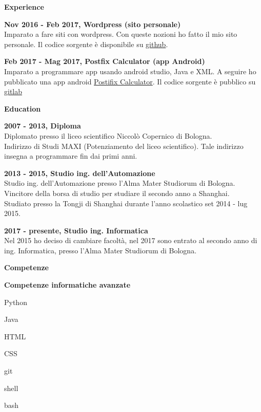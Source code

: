 \documentclass[a4paper,12pt,final]{memoir}
\newcommand{\Sep}{\vspace{1.5em}}
\newcommand{\SmallSep}{\vspace{0.5em}}
\newcommand{\CVSection}[1]
	{\Large\textbf{#1}\par
	\SmallSep\normalsize\normalfont}
\newcommand{\CVItem}[1]
	{\textbf{\color{RoyalBlue} #1}}
\begin{document}
\CVSection{Experience}
\CVItem{Nov 2016 - Feb 2017, Wordpress (sito personale)}\\
	Imparato a fare siti con wordpress. 
	Con queste nozioni ho fatto il mio sito personale. Il codice sorgente è disponibile su \href{https://github.com/Mot93/MattiaRubini-com-wordpress-theme}{github}.
\SmallSep

\CVItem{Feb 2017 - Mag 2017, Postfix Calculator (app Android)}\\
	Imparato a programmare app usando android studio, Java e XML. 
	A seguire ho pubblicato una app android \href{https://play.google.com/store/apps/details?id=postfixcalculator.mattiarubini.com.postfixcalculator}{ Postifix Calculator}.
	Il codice sorgente è pubblico su \href{https://gitlab.com/mattia.rubini/PostfixCalculator}{gitlab}
\Sep

\CVSection{Education}
\CVItem{2007 - 2013, Diploma}\\
	Diplomato presso il liceo scientifico Niccolò Copernico di Bologna.\\
	Indirizzo di Studi MAXI (Potenziamento del liceo scientifico).
	Tale indirizzo insegna a programmare fin dai primi anni. 
\SmallSep

\CVItem{2013 - 2015, Studio ing. dell'Automazione}\\
	Studio ing. dell'Automazione presso l'Alma Mater Studiorum di Bologna.\\
	Vincitore della borsa di studio per studiare il secondo anno a Shanghai.\\
	Studiato presso la Tongji di Shanghai durante l'anno scolastico set 2014 - lug 2015.
\SmallSep

\CVItem{2017 - presente, Studio ing. Informatica}\\
	Nel 2015 ho deciso di cambiare facoltà, nel 2017 sono entrato al secondo anno di ing. Informatica, presso l'Alma Mater Studiorum di Bologna.
\Sep

\CVSection{Competenze}
\CVItem{Competenze informatiche avanzate}
\begin{multicols}{3}
\begin{compactitem}[\color{RoyalBlue}$\circ$]
	\item Python 
	\item Java
	\item HTML
	\item CSS
	\item git
	\item shell
	\item bash
\end{compactitem}
\end{multicols}
\SmallSep
\end{document}
